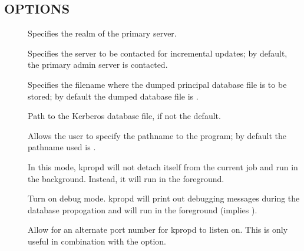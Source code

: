 \documentclass[letterpaper,10pt,english]{sphinxmanual}
\begin{document}
\subsection{OPTIONS}
\label{\detokenize{admin/admin_commands/kpropd:options}}\begin{description}
\item[{ }] \leavevmode
Specifies the realm of the primary server.

\item[{ }] \leavevmode
Specifies the server to be contacted for incremental updates; by
default, the primary admin server is contacted.

\item[{ }] \leavevmode
Specifies the filename where the dumped principal database file is
to be stored; by default the dumped database file is {\hyperref[\detokenize{mitK5defaults:paths}]{}}.

\item[{ }] \leavevmode
Path to the Kerberos database file, if not the default.

\item[{}] \leavevmode
Allows the user to specify the pathname to the {\hyperref[\detokenize{admin/admin_commands/kdb5_util:kdb5-util-8}]{}}
program; by default the pathname used is {\hyperref[\detokenize{mitK5defaults:paths}]{}}.

\item[{}] \leavevmode
In this mode, kpropd will not detach itself from the current job
and run in the background.  Instead, it will run in the
foreground.

\item[{}] \leavevmode
Turn on debug mode.  kpropd will print out debugging messages
during the database propogation and will run in the foreground
(implies ).

\item[{}] \leavevmode
Allow for an alternate port number for kpropd to listen on.  This
is only useful in combination with the  option.


\end{description}
\end{document}
